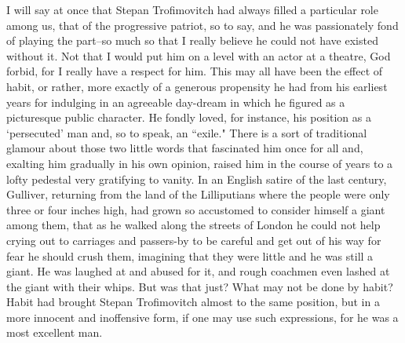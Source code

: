 \documentclass[12pt]{article}
\begin{document}
\vspace{12pt}
I will say at once that Stepan Trofimovitch had always filled a
particular role among us, that of the progressive patriot, so to say,
and he was passionately fond of playing the part--so much so that I
really believe he could not have existed without it. Not that I would
put him on a level with an actor at a theatre, God forbid, for I really
have a respect for him. This may all have been the effect of habit, or
rather, more exactly of a generous propensity he had from his earliest
years for indulging in an agreeable day-dream in which he figured as
a picturesque public character. He fondly loved, for instance, his
position as a `persecuted' man and, so to speak, an ``exile." There is a
sort of traditional glamour about those two little words that fascinated
him once for all and, exalting him gradually in his own opinion, raised
him in the course of years to a lofty pedestal very gratifying to
vanity. In an English satire of the last century, Gulliver, returning
from the land of the Lilliputians where the people were only three or
four inches high, had grown so accustomed to consider himself a giant
among them, that as he walked along the streets of London he could not
help crying out to carriages and passers-by to be careful and get out of
his way for fear he should crush them, imagining that they were little
and he was still a giant. He was laughed at and abused for it, and rough
coachmen even lashed at the giant with their whips. But was that just?
What may not be done by habit? Habit had brought Stepan Trofimovitch
almost to the same position, but in a more innocent and inoffensive
form, if one may use such expressions, for he was a most excellent man.
\end{document}
